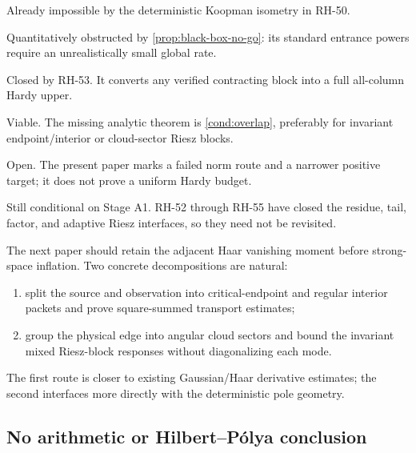 \documentclass[11pt]{article}
\theoremstyle{remark}
\begin{document}
\begin{description}[leftmargin=5.0cm,style=nextline]
 \item[Global fixed-step $L^2$ contraction]
 Already impossible by the deterministic Koopman isometry in RH-50.

 \item[Growing-horizon standard strong black box]
 Quantitatively obstructed by \cref{prop:black-box-no-go}: its standard
 entrance powers require an unrealistically small global rate.

 \item[Deterministic finite-matrix tail]
 Closed by RH-53.  It converts any verified contracting block into a full
 all-column Hardy upper.

 \item[Directional overlap route]
 Viable.  The missing analytic theorem is \cref{cond:overlap}, preferably
 for invariant endpoint/interior or cloud-sector Riesz blocks.

 \item[Stage A1]
 Open.  The present paper marks a failed norm route and a narrower positive
 target; it does not prove a uniform Hardy budget.

 \item[Stage A4 intrinsic identification]
 Still conditional on Stage A1.  RH-52 through RH-55 have closed the residue,
 tail, factor, and adaptive Riesz interfaces, so they need not be revisited.
\end{description}

The next paper should retain the adjacent Haar vanishing moment before
strong-space inflation.  Two concrete decompositions are natural:
\begin{enumerate}[leftmargin=2.2em]
 \item split the source and observation into critical-endpoint and regular
       interior packets and prove square-summed transport estimates;
 \item group the physical edge into angular cloud sectors and bound the
       invariant mixed Riesz-block responses without diagonalizing each mode.
\end{enumerate}
The first route is closer to existing Gaussian/Haar derivative estimates;
the second interfaces more directly with the deterministic pole geometry.

\subsection{No arithmetic or Hilbert--P\'olya conclusion}
\end{document}
